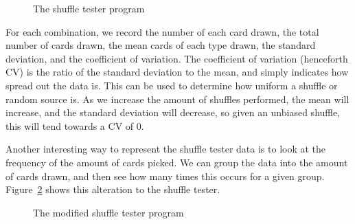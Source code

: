 \begin{figure}[h]
    \caption{The shuffle tester program}%
    \label{fig:shuffletester}
\end{figure}

For each combination, we record the number of each card drawn, the total
number of cards drawn, the mean cards of each type drawn, the standard
deviation, and the coefficient of variation. The coefficient of variation
(henceforth CV) is the ratio of the standard deviation to the mean, and
simply indicates how spread out the data is. This can be used to determine
how uniform a shuffle or random source is. As we increase the amount of
shuffles performed, the mean will increase, and the standard deviation will
decrease, so given an unbiased shuffle, this will tend towards a CV of 0.

Another interesting way to represent the shuffle tester data is to look at
the frequency of the amount of cards picked. We can group the data into
the amount of cards drawn, and then see how many times this occurs for a given
group. Figure~\ref{fig:shuffletester2} shows this alteration to the shuffle
tester.

\begin{figure}[h]
    \caption{The modified shuffle tester program}%
    \label{fig:shuffletester2}
\end{figure}

